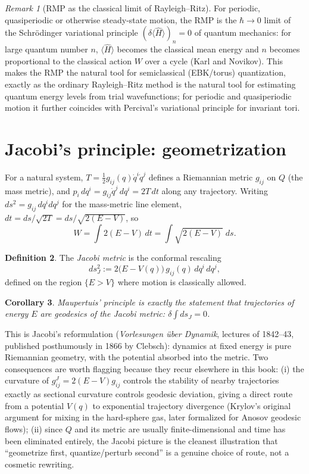 \documentclass[11pt]{book}
\theoremstyle{definition}
\newtheorem{definition}{Definition}[section]
\theoremstyle{plain}
\newtheorem{corollary}[definition]{Corollary}
\theoremstyle{remark}
\newtheorem{remark}[definition]{Remark}
\begin{document}
\begin{remark}[RMP as the classical limit of Rayleigh--Ritz]
For periodic, quasiperiodic or otherwise steady-state motion, the RMP is the $\hbar\to0$ limit of the Schrödinger variational principle $(\delta\langle\hat H\rangle)_n=0$ of quantum mechanics: for large quantum number $n$, $\langle\hat H\rangle$ becomes the classical mean energy and $n$ becomes proportional to the classical action $W$ over a cycle (Karl and Novikov). This makes the RMP the natural tool for semiclassical (EBK/torus) quantization, exactly as the ordinary Rayleigh--Ritz method is the natural tool for estimating quantum energy levels from trial wavefunctions; for periodic and quasiperiodic motion it further coincides with Percival's variational principle for invariant tori.
\end{remark}

\section{Jacobi's principle: geometrization}
\label{sec:jacobi}

For a natural system, $T=\tfrac12 g_{ij}(q)\dot q^i\dot q^j$ defines a Riemannian metric $g_{ij}$ on $Q$ (the mass metric), and $p_i\,dq^i = g_{ij}\dot q^j\,dq^i = 2T\,dt$ along any trajectory. Writing $ds^2=g_{ij}\,dq^idq^j$ for the mass-metric line element, $dt = ds/\sqrt{2T}=ds/\sqrt{2(E-V)}$, so
\[
W=\int 2(E-V)\,dt = \int \sqrt{2(E-V)}\;ds .
\]

\begin{definition}
\label{def:jacobi-metric}
The \emph{Jacobi metric} is the conformal rescaling
\[
ds_J^2 := 2\big(E-V(q)\big)\,g_{ij}(q)\,dq^i\,dq^j,
\]
defined on the region $\{E>V\}$ where motion is classically allowed.
\end{definition}

\begin{corollary}
Maupertuis' principle is exactly the statement that trajectories of energy $E$ are \emph{geodesics} of the Jacobi metric: $\delta\!\int ds_J = 0$.
\end{corollary}

This is Jacobi's reformulation (\emph{Vorlesungen über Dynamik}, lectures of 1842--43, published posthumously in 1866 by Clebsch): dynamics at fixed energy is pure Riemannian geometry, with the potential absorbed into the metric. Two consequences are worth flagging because they recur elsewhere in this book: (i) the curvature of $g^J_{ij}=2(E-V)g_{ij}$ controls the stability of nearby trajectories exactly as sectional curvature controls geodesic deviation, giving a direct route from a potential $V(q)$ to exponential trajectory divergence (Krylov's original argument for mixing in the hard-sphere gas, later formalized for Anosov geodesic flows); (ii) since $Q$ and its metric are usually finite-dimensional and time has been eliminated entirely, the Jacobi picture is the cleanest illustration that ``geometrize first, quantize/perturb second'' is a genuine choice of route, not a cosmetic rewriting.
\end{document}
